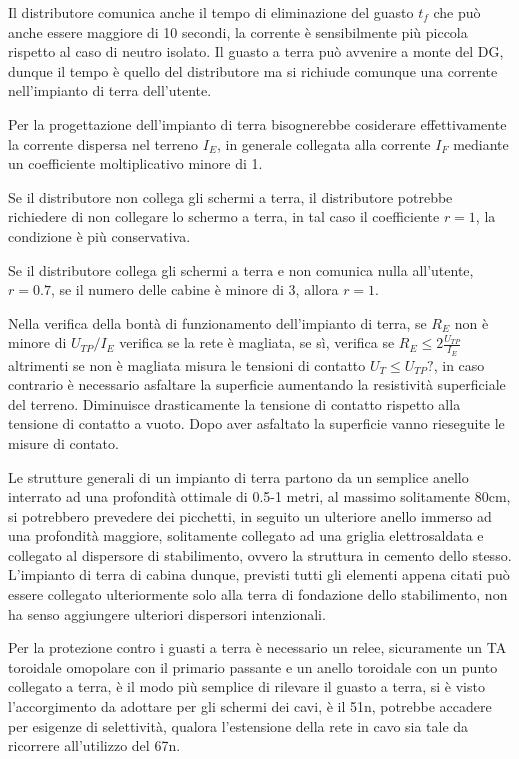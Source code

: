 Il distributore comunica anche il tempo di eliminazione del guasto $t_f$ che può anche essere maggiore di 10 secondi, la corrente è sensibilmente più piccola rispetto al caso di neutro isolato. Il guasto a terra può avvenire a monte del DG, dunque il tempo è quello del distributore ma si richiude comunque una corrente nell'impianto di terra dell'utente.


Per la progettazione dell'impianto di terra bisognerebbe cosiderare effettivamente la corrente dispersa nel terreno $I_E$, in generale collegata alla corrente $I_F$ mediante un coefficiente moltiplicativo minore di 1.

Se il distributore non collega gli schermi a terra, il distributore potrebbe richiedere di non collegare lo schermo a terra, in tal caso il coefficiente $r=1$, la condizione è più conservativa.

Se il distributore collega gli schermi a terra e non comunica nulla all'utente, $r=0.7$, se il numero delle cabine è minore di 3, allora $r=1$.

Nella verifica della bontà di funzionamento dell'impianto di terra, se $R_E$ 
non è minore di $U_{TP}/I_E$ verifica se la rete è magliata, se sì, verifica se 
$R_E\leq 2\frac{U_{TP}}{I_E}$ altrimenti se non è magliata misura le tensioni 
di contatto $U_{T} \leq U_{TP}?$, in caso contrario è necessario asfaltare la 
superficie aumentando la resistività superficiale del terreno. Diminuisce 
drasticamente la tensione di contatto rispetto alla tensione di contatto a 
vuoto.
Dopo aver asfaltato la superficie vanno rieseguite le misure di contato.

Le strutture generali di un impianto di terra partono da un semplice anello  
interrato ad una profondità ottimale di 0.5-1 metri, al massimo solitamente 
80cm, si potrebbero prevedere dei picchetti, in seguito un ulteriore anello 
immerso ad una profondità maggiore, solitamente collegato ad una griglia 
elettrosaldata e collegato al dispersore di stabilimento, ovvero la struttura 
in cemento dello stesso. L'impianto di terra di cabina dunque, previsti tutti 
gli elementi appena citati può essere collegato ulteriormente solo alla terra 
di fondazione dello stabilimento, non ha senso aggiungere ulteriori dispersori 
intenzionali.

Per la protezione contro i guasti a terra è necessario un relee, sicuramente un 
TA toroidale omopolare con il primario passante e un anello toroidale con un 
punto collegato a terra, è il modo più semplice di rilevare il guasto a terra, 
si è visto l'accorgimento da adottare per gli schermi dei cavi, è il 51n, 
potrebbe accadere per esigenze di selettività, qualora l'estensione della rete 
in cavo sia tale da ricorrere all'utilizzo del 67n.

